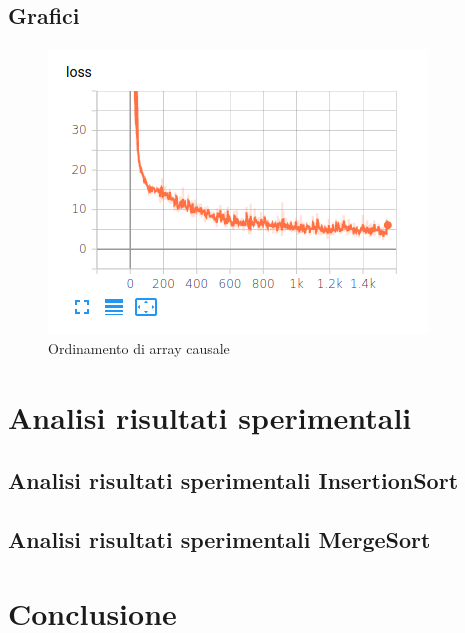 \documentclass[a4paper,titlepage]{book}
\begin{document}
\subsection{Grafici}
\begin{figure}[H]
\includegraphics[width=\textwidth]{loss.png}
\caption{Ordinamento di array causale}
\end{figure}
\section{Analisi risultati sperimentali}
\subsection{Analisi risultati sperimentali InsertionSort} 

\subsection{Analisi risultati sperimentali MergeSort}


\section{Conclusione}
\end{document}
